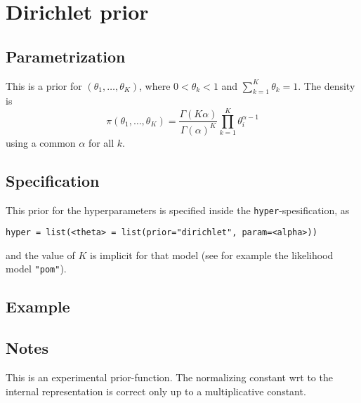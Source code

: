 \documentclass[a4paper,11pt]{article}
\begin{document}
\section*{Dirichlet prior}

\subsection*{Parametrization}
This is a prior for $(\theta_1, \ldots, \theta_K)$, where
$0<\theta_k<1$ and $\sum_{k=1}^{K} \theta_k = 1$. The density is
\begin{displaymath}
    \pi(\theta_1, \ldots, \theta_K) = \frac{\Gamma(K\alpha)}{\Gamma(\alpha)^{K}}
    \prod_{k=1}^{K} \theta_i^{\alpha-1}
\end{displaymath}
using a common $\alpha$ for all $k$.

\subsection*{Specification}

This prior for the hyperparameters is specified inside the
\texttt{hyper}-spesification, as
\begin{center}
    \texttt{hyper = list(<theta> =
        list(prior="dirichlet", param=<alpha>))}
\end{center}
and the value of $K$ is implicit for that model (see for example the
likelihood model \texttt{"pom"}).

\subsection*{Example}

\subsection*{Notes}

This is an experimental prior-function. The normalizing constant wrt
to the internal representation is correct only up to a multiplicative
constant.
\end{document}
